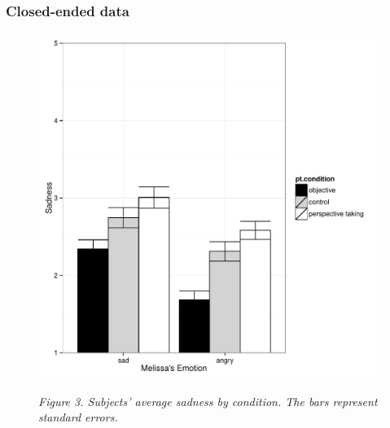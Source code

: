\documentclass[man,a4paper,noextraspace,apacite]{apa6}\usepackage[]{graphicx}\usepackage[]{color}
\makeatletter
\def\maxwidth{ %
  \ifdim\Gin@nat@width>\linewidth
    \linewidth
  \else
    \Gin@nat@width
  \fi
}
\newenvironment{knitrout}{}{} %
\makeatother
\begin{document}
\subsubsection{Closed-ended data}

\begin{figure}
\begin{knitrout}
\color{fgcolor}
\includegraphics[width=\maxwidth]{figure/Figure3Sad-1} 

\end{knitrout}
\textit{Figure 3. Subjects' average sadness by condition. The bars represent standard errors.}
\end{figure}
\end{document}

